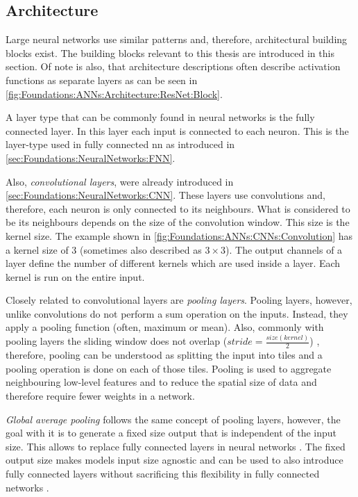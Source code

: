 \subsection{Architecture}
\label{sec:Foundations:NeuralNetworks:Architecture}

Large neural networks use similar patterns and, therefore, architectural building blocks exist. The building blocks relevant to this thesis are introduced in this section.
Of note is also, that architecture descriptions often describe activation functions as separate layers as can be seen in \autoref{fig:Foundations:ANNs:Architecture:ResNet:Block}.

A layer type that can be commonly found in neural networks is the fully connected layer. In this layer each input is connected to each neuron. This is the layer-type used in fully connected \ac{nn} as introduced in \autoref{sec:Foundations:NeuralNetworks:FNN}.

Also, \emph{convolutional layers}, were already introduced in \autoref{sec:Foundations:NeuralNetworks:CNN}. These layers use convolutions and, therefore, each neuron is only connected to its neighbours. What is considered to be its neighbours depends on the size of the convolution window. This size is the kernel size. The example shown in \autoref{fig:Foundations:ANNs:CNNs:Convolution} has a kernel size of 3 (sometimes also described as $3 \times 3$). The output channels of a layer define the number of different kernels which are used inside a layer. Each kernel is run on the entire input.

Closely related to convolutional layers are \emph{pooling layers}. Pooling layers, however, unlike convolutions do not perform a sum operation on the inputs. Instead, they apply a pooling function (often, maximum or mean). Also, commonly with pooling layers the sliding window does not overlap ($stride = \frac{size(kernel)}{2}$) \cite{scherer2010evaluation}, therefore, pooling can be understood as splitting the input into tiles and a pooling operation is done on each of those tiles. Pooling is used to aggregate neighbouring low-level features and to reduce the spatial size of data and therefore require fewer weights in a network.

\emph{Global average pooling} follows the same concept of pooling layers, however, the goal with it is to generate a fixed size output that is independent of the input size. This allows to replace fully connected layers in neural networks \cite{lin2014network}. The fixed output size makes models input size agnostic and can be used to also introduce fully connected layers without sacrificing this flexibility in fully connected networks \cite{he2016deep}.


